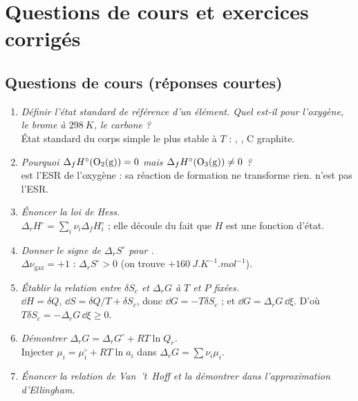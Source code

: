 \chapter{Questions de cours et exercices corrigés}
\label{ch:exos}

\section*{Questions de cours (réponses courtes)}

\begin{enumerate}[label=\textbf{Q\arabic*.},leftmargin=2.6em,itemsep=0.5em]
  \item \emph{Définir l'état standard de référence d'un élément. Quel est-il pour l'oxygène, le brome à $\SI{298}{K}$, le carbone ?}\\
  État standard du corps simple le plus stable à $T$ : , , C graphite.
  \item \emph{Pourquoi $\Delta_fH^\circ(\ce{O2(g)}) = 0$ mais $\Delta_fH^\circ(\ce{O3(g)})\neq0$ ?}\\
   est l'ESR de l'oxygène : sa réaction de formation ne transforme rien.  n'est pas l'ESR.
  \item \emph{Énoncer la loi de Hess.}\\
  $\Delta_rH^\circ = \sum_i\nu_i\Delta_fH^\circ_i$ ; elle découle du fait que $H$ est une fonction d'état.
  \item \emph{Donner le signe de $\Delta_rS^\circ$ pour .}\\
  $\Delta\nu_{\text{gaz}} = +1$ : $\Delta_rS^\circ>0$ (on trouve $+\SI{160}{J.K^{-1}.mol^{-1}}$).
  \item \emph{Établir la relation entre $\delta S_c$ et $\Delta_rG$ à $T$ et $P$ fixées.}\\
  $\dd H = \delta Q$, $\dd S = \delta Q/T + \delta S_c$, donc $\dd G = -T\delta S_c$ ; et $\dd G = \Delta_rG\,\dd\xi$. D'où $T\delta S_c = -\Delta_rG\,\dd\xi \geq 0$.
  \item \emph{Démontrer $\Delta_rG = \Delta_rG^\circ + RT\ln Q_r$.}\\
  Injecter $\mu_i = \mu_i^\circ + RT\ln a_i$ dans $\Delta_rG = \sum\nu_i\mu_i$.
  \item \emph{Énoncer la relation de Van~'t~Hoff et la démontrer dans l'approximation d'Ellingham.}\\

\end{enumerate}
